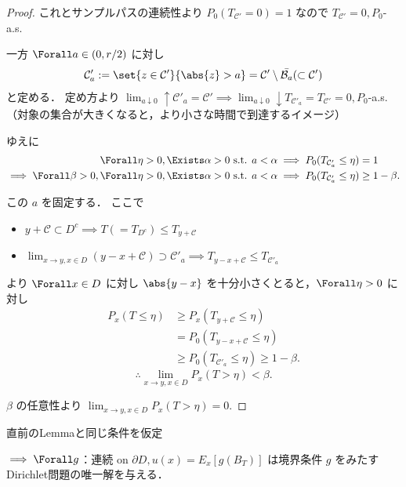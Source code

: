 \documentclass{jsarticle}
\begin{document}
\begin{proof}
    これとサンプルパスの連続性より $P_0(T_{\mathcal{C}'}=0) = 1$ なので $T_{\mathcal{C}'}=0, P_0$-a.s.\nazo

    一方 $\Forall a\in(0, r/2)$ に対し
    \begin{align}
        \mathcal{C}'_a
        := \set{z\in\mathcal{C}'}{\abs{z}>a}
        = \mathcal{C}'\setminus \bar{\mathcal{B}_{a}}
        (\subset \mathcal{C}')
    \end{align}
    と定める．
    定め方より $\lim_{a\downarrow0}\uparrow\mathcal{C}'_a=\mathcal{C}'\implies \lim_{a\downarrow0}\downarrow T_{\mathcal{C}'_a}=T_{\mathcal{C}'}=0, P_0$-a.s.（対象の集合が大きくなると，より小さな時間で到達するイメージ）

    ゆえに 
    \begin{align}
        \Forall \eta>0, \Exists \alpha>0\text{ s.t. }
        & a<\alpha\implies P_0(T_{\mathcal{C}'_a}\le\eta)=1 \\
        \implies 
        \Forall \beta>0, \Forall \eta>0, \Exists \alpha>0\text{ s.t. }
        & a<\alpha\implies P_0(T_{\mathcal{C}'_a}\le\eta)\ge1-\beta.
    \end{align}

    この $a$ を固定する．
    ここで
    \begin{itemize}
        \item 
        $y+\mathcal{C}\subset D^c\implies T(=T_{D^c})\le T_{y+\mathcal{C}}$
        \item
        $\lim_{x\to y, x\in D}(y-x+\mathcal{C})\supset \mathcal{C}'_a\implies T_{y-x+\mathcal{C}}\le T_{\mathcal{C}'_a}$
    \end{itemize}
     より $\Forall x\in D$ に対し $\abs{y-x}$ を十分小さくとると，$\Forall \eta>0$ に対し
     \begin{align}
         P_x(T\le\eta)
         &\ge P_x(T_{y+\mathcal{C}}\le\eta) \\
         &= P_0(T_{y-x+\mathcal{C}}\le\eta) \\
         &\ge P_0(T_{\mathcal{C}'_a}\le\eta)
         \ge 1-\beta.
     \end{align}
     $$
     \therefore 
     \lim_{x\to y, x\in D}P_x(T>\eta)<\beta.
     $$

     $\beta$ の任意性より $\lim_{x\to y, x\in D}P_x(T>\eta)=0.$
\end{proof}


\begin{shadebox}
    \setcounter{thm}{7}
    \begin{thm}[Dirichlet問題の解]\label{thm:708}
        直前のLemmaと同じ条件を仮定
        
        $\implies \Forall g$：連続 on $\partial D, u(x) = E_x[g(B_T)]$ は境界条件 $g$ をみたすDirichlet問題の唯一解を与える．
    \end{thm}
\end{shadebox}
\end{document}
